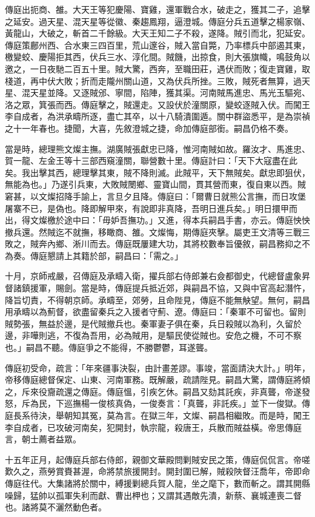 \begin{pinyinscope}
傳庭出扼商、雒。大天王等犯慶陽、寶雞，還軍戰合水，破走之，獲其二子，追擊之延安。過天星、混天星等從徽、秦趨鳳翔，逼澄城。傳庭分兵五道擊之楊家嶺、黃龍山，大破之，斬首二千餘級。大天王知二子不殺，遂降。賊引而北，犯延安。傳庭策鄜州西、合水東三四百里，荒山邃谷，賊入當自斃，乃率標兵中部遏其東，檄變蛟、慶陽拒其西，伏兵三水、淳化間。賊饑，出掠食，則大張旗幟，鳴鼓角以邀之，一日夜馳二百五十里。賊大驚，西奔，至職田莊，遇伏而敗；復走寶雞，取棧道，再中伏大敗；折而走隴州關山道，又為伏兵所挫。三敗，賊死者無算，過天星、混天星並降。又逐賊邠、寧間，陷陣，獲其渠。河南賊馬進忠、馬光玉驅宛、洛之眾，箕張而西。傳庭擊之，賊還走。又設伏於潼關原，變蛟逐賊入伏。而闖王李自成者，為洪承疇所逐，盡亡其卒，以十八騎潰圍遁。關中群盜悉平，是為崇禎之十一年春也。捷聞，大喜，先敘澄城之捷，命加傳庭部銜。嗣昌仍格不奏。

當是時，總理熊文燦主撫。湖廣賊張獻忠已降，惟河南賊如故。羅汝才、馬進忠、賀一龍、左金王等十三部西窺潼關，聯營數十里。傳庭計曰：「天下大寇盡在此矣。我出擊其西，總理擊其東，賊不降則滅。此賊平，天下無賊矣。獻忠即狙伏，無能為也。」乃遂引兵東，大敗賊閿鄉、靈寶山間，貫其營而東，復自東以西。賊窘甚，以文燦招降手諭上，言旦夕且降。傳庭曰：「爾曹日就熊公言撫，而日攻堡屠寨不已，是偽也。降即解甲來，有說即非真降，吾明日進兵矣。」明日擐甲而出，得文燦檄於途中曰：「毋妒吾撫功。」又進，得本兵嗣昌手書，亦云。傳庭怏怏撤兵還。然賊迄不就撫，移瞰商、雒。文燦悔，期傳庭夾擊。屬吏王文清等三戰三敗之，賊奔內鄉、淅川而去。傳庭既屢建大功，其將校數奉旨優敘，嗣昌務抑之不為奏。傳庭懇請上其籍於部，嗣昌曰：「需之。」

十月，京師戒嚴，召傳庭及承疇入衛，擢兵部右侍郎兼右僉都御史，代總督盧象昇督諸鎮援軍，賜劍。當是時，傳庭提兵抵近郊，與嗣昌不協，又與中官高起潛忤，降旨切責，不得朝京師。承疇至，郊勞，且命陛見，傳庭不能無觖望。無何，嗣昌用承疇以為薊督，欲盡留秦兵之入援者守薊、遼。傳庭曰：「秦軍不可留也。留則賊勢張，無益於邊，是代賊撤兵也。秦軍妻子俱在秦，兵日殺賊以為利，久留於邊，非嘩則逃，不復為吾用，必為賊用，是驅民使從賊也。安危之機，不可不察也。」嗣昌不聽。傳庭爭之不能得，不勝鬱鬱，耳遂聾。

傳庭初受命，疏言：「年來疆事決裂，由計畫差謬。事竣，當面請決大計。」明年，帝移傳庭總督保定、山東、河南軍務。既解嚴，疏請陛見。嗣昌大驚，謂傳庭將傾之，斥來役齎疏還之傳庭。傳庭慍，引疾乞休。嗣昌又劾其託疾，非真聾，帝遂發怒，斥為民，下巡撫楊一俊核真偽，一俊奏言：「真聾，非託疾。」並下一俊獄。傳庭長系待決，舉朝知其冤，莫為言。在獄三年，文燦、嗣昌相繼敗。而是時，闖王李自成者，已攻破河南矣，犯開封，執宗龍，殺唐王，兵散而賊益橫。帝思傳庭言，朝士薦者益眾。

十五年正月，起傳庭兵部右侍郎，親御文華殿問剿賊安民之策，傳庭侃侃言。帝嗟歎久之，燕勞賞賚甚渥，命將禁旅援開封。開封圍已解，賊殺陜督汪喬年，帝即命傳庭往代。大集諸將於關中，縛援剿總兵賀人龍，坐之麾下，數而斬之。謂其開縣噪歸，猛帥以孤軍失利而獻、曹出柙也；又謂其遇敵先潰，新蔡、襄城連喪二督也。諸將莫不灑然動色者。


\end{pinyinscope}

